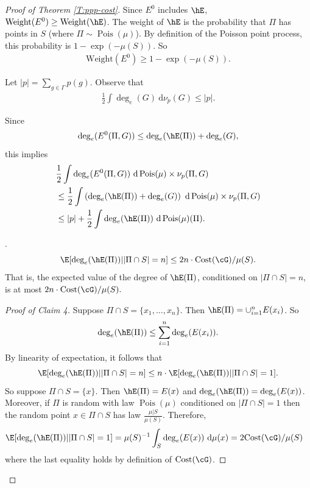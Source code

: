 \documentclass[12pt]{article}
\theoremstyle{plain}
\theoremstyle{definition}
\theoremstyle{remark}
\newcommand{\G}{\Gamma}
\newcommand{\eps}{\epsilon}
\newcommand\cost{{\operatorname{Cost}}}
\newcommand\Pois{\operatorname{Pois}}
\newcommand{\dee}{\textrm{d}}
\begin{document}
\begin{proof}[Proof of Theorem \ref{T:ppp-cost}]
Since $E^0$ includes $\hE$, $\text{Weight}(E^0)\ge \text{Weight}(\hE)$. The weight of $\hE$ is the probability that $\Pi$ has points in $S$ (where $\Pi \sim \Pois(\mu)$). By definition of the Poisson point process, this probability is $1-\exp(-\mu(S))$. So 
\begin{align}\label{E:cost9}
    \text{Weight}(E^0) \ge 1-\exp(-\mu(S)).
\end{align}

Let $|p|=\sum_{g\in \G} p(g)$. Observe that
\begin{align}\label{E:cost8}
   \frac{1}{2}\int \deg_e(G)~\dee \nu_p(G) \le |p|.
\end{align}

Since 
$$\deg_e(E^0(\Pi,G))\le \deg_e(\hE(\Pi))+\deg_e(G),$$
this implies
\begin{align*}
    &\frac{1}{2}\int \deg_e(E^0(\Pi,G))~\dee \Pois(\mu)\times \nu_p(\Pi,G)\\
    &\le \frac{1}{2}\int \left(\deg_e(\hE(\Pi))+\deg_e(G)\right)~\dee\Pois(\mu)\times \nu_p(\Pi,G) \\
     &\le |p|+\frac{1}{2}\int \deg_e(\hE(\Pi))~\dee \Pois(\mu)(\Pi).
\end{align*}

. 
$$\E[\deg_e(\hE(\Pi))| |\Pi \cap S|=n] \le  2n \cdot \cost(\cG)/\mu(S).$$
That is, the expected value of the degree of $\hE(\Pi)$, conditioned on $|\Pi \cap S|=n$, is at most $2n \cdot \cost(\cG)/\mu(S).$

\begin{proof}[Proof of Claim 4]
Suppose $\Pi \cap S=\{x_1,\ldots, x_n\}$. Then $\hE(\Pi)=\cup_{i=1}^n E(x_i)$. So
$$\deg_e(\hE(\Pi)) \le \sum_{i=1}^n \deg_e(E(x_i)).$$
By linearity of expectation, it follows that
$$\E[\deg_e(\hE(\Pi))| |\Pi \cap S|=n] \le n\cdot \E[\deg_e(\hE(\Pi))| |\Pi \cap S|=1].$$
So suppose $\Pi\cap S=\{x\}$. Then $\hE(\Pi)=E(x)$ and $\deg_e(\hE(\Pi))=\deg_e(E(x))$. Moreover, if $\Pi$ is random with law $\Pois(\mu)$ conditioned on $|\Pi \cap S|=1$ then the random point $x \in \Pi\cap S$ has law $\frac{\mu|S}{\mu(S)}$. Therefore,
\begin{align*}
    \E[\deg_e(\hE(\Pi))| |\Pi \cap S|=1] &= \mu(S)^{-1} \int_S \deg_e(E(x))~\dee\mu(x) = 2 \cost(\cG)/\mu(S)
\end{align*}
where the last equality holds by definition of $\cost(\cG)$. 
\end{proof}


\end{proof}
\end{document}
